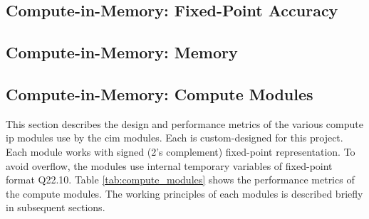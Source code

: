 \documentclass[12pt, hidelinks]{article}
\begin{document}
\subsection{Compute-in-Memory: Fixed-Point Accuracy}
\subsection{Compute-in-Memory: Memory}
\subsection{Compute-in-Memory: Compute Modules}
This section describes the design and performance metrics of the various compute \ac{ip} modules use by the \ac{cim} modules. Each is custom-designed for this project.
Each module works with signed (2's complement) fixed-point representation. To avoid overflow, the modules use internal temporary variables of fixed-point format Q22.10.
Table \ref{tab:compute_modules} shows the performance metrics of the compute modules. The working principles of each modules is described briefly in subsequent sections.
\end{document}
